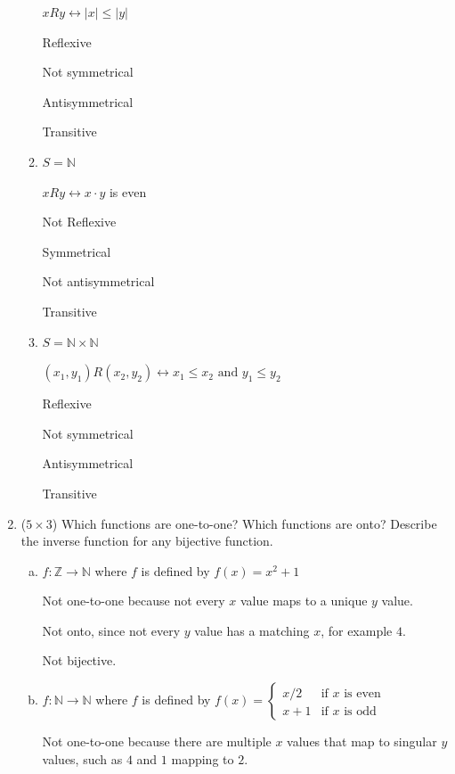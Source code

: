 \documentclass[12pt]{article}
\newcommand{\ro}{R}
\begin{document}
\begin{enumerate}
\begin{enumerate}
						$x \ro y \leftrightarrow |x| \leq |y|$

						Reflexive

						Not symmetrical

						Antisymmetrical

						Transitive

						\item
						$S = \mathbb{N}$

						$x \ro y \leftrightarrow x \cdot y$ is even

						Not Reflexive

						Symmetrical

						Not antisymmetrical

						Transitive
						\item
						$S = \mathbb{N} \times \mathbb{N}$

						$\left(x_1, y_1\right) \ro \left(x_2, y_2\right) \leftrightarrow x_1 \leq x_2 \text{ and } y_1 \leq y_2$

						Reflexive

						Not symmetrical

						Antisymmetrical

						Transitive
					\end{enumerate}


				\newpage
				\item ($5 \times 3$)
				Which functions are one-to-one? Which functions are onto? Describe the inverse function for any bijective function.
				\begin{enumerate}[a.]
					\item
					$f: \mathbb{Z} \to \mathbb{N}$ where $f$ is defined by $f\left(x\right) = x^2 +1$

					Not one-to-one because not every $x$ value maps to a unique $y$ value.

					Not onto, since not every $y$ value has a matching $x$, for example $4$.

					Not bijective.

					\item
					$f: \mathbb{N} \to \mathbb{N}$ where $f$ is defined by $f\left(x\right) = \left\lbrace
					\begin{array}{ll}
					x/2 & \mbox{if } x \mbox{ is even } \\
					x + 1 & \mbox{if } x \mbox{ is odd }
					\end{array}
					\right.$

					Not one-to-one because there are multiple $x$ values that map to singular $y$ values, such as $4$ and $1$ mapping to $2$.


\end{enumerate}
\end{enumerate}
\end{document}
